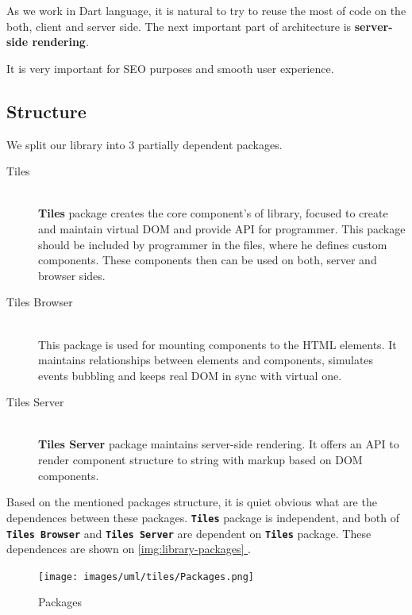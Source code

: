 \documentclass[oneside, 12pt]{book}
\newcommand*{\fullref}[1]{\hyperref[{#1}]{\autoref*{#1} \nameref*{#1}}}
\begin{document}
    As we work in Dart language, it is natural to try to reuse the most of code on the both, client and server side.
    The next important part of architecture is \textbf{server-side rendering}.

    It is very important for SEO purposes and smooth user experience. 

  \subsection{Structure}\label{subsec:our-architecture-structure}

    We split our library into 3 partially dependent packages. 
    \begin{description}
      \item[Tiles] \hfill \\
        \textbf{Tiles} package creates the core component's of library, focused to create and maintain virtual DOM and provide API for programmer.
        This package should be included by programmer in the files, where he defines custom components. 
        These components then can be used on both, server and browser sides.
      \item[Tiles Browser] \hfill \\
        This package is used for mounting components to the HTML elements. 
        It maintains relationships between elements and components, 
        simulates events bubbling and keeps real DOM in sync with virtual one.
      \item[Tiles Server] \hfill \\
        \textbf{Tiles Server} package maintains server-side rendering. It offers an API to render component structure to string with markup based on DOM components.
    \end{description}

    Based on the mentioned packages structure, it is quiet obvious what are the dependences between these packages.
    \texttt{\textbf{Tiles}} package is independent, 
    and both of \texttt{\textbf{Tiles Browser}} and \texttt{\textbf{Tiles Server}} are dependent on \texttt{\textbf{Tiles}} package.
    These dependences are shown on \fullref{img:library-packages}.

    \begin{figure}[h]
    \centering  
      \texttt{[image: images/uml/tiles/Packages.png]}
      \caption{Packages}
      \label{img:library-packages}
    \end{figure}
\end{document}
